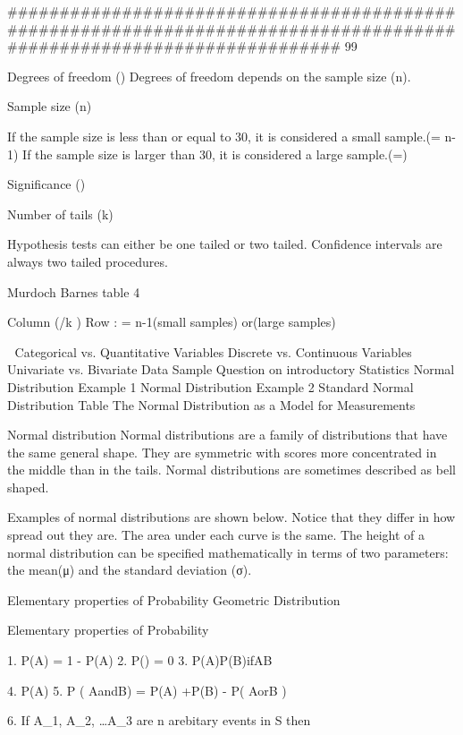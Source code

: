 

######################################################################################################################
99%


Degrees of freedom ()
Degrees of freedom depends on the sample size (n).

Sample size (n)

If the sample size is less than or equal to 30, it is considered a small sample.(= n-1)
If the sample size is larger than 30, it is considered a large sample.(=)

Significance ()

Number of tails (k)

Hypothesis tests can either be one tailed or two tailed.
Confidence intervals are always two tailed procedures.


Murdoch Barnes table 4

Column (/k )
Row : = n-1(small samples) or(large samples)



Categorical vs. Quantitative Variables
Discrete vs. Continuous Variables
Univariate vs. Bivariate Data
Sample Question on introductory Statistics
Normal Distribution Example 1
Normal Distribution Example 2
Standard Normal Distribution Table
The Normal Distribution as a Model for Measurements

Normal distribution
Normal distributions are a family of distributions that have the same general shape. They are symmetric with scores more concentrated in the middle than in the tails. Normal distributions are sometimes described as bell shaped. 

Examples of normal distributions are shown below. Notice that they differ in how spread out they are. The area under each curve is the same. The height of a normal distribution can be specified mathematically in terms of two parameters: the mean(μ) and the standard deviation (σ). 

 

Elementary properties of Probability
Geometric Distribution
 
Elementary properties of Probability
 
  1. P(A) = 1 - P(A)
2. P() = 0
3. P(A)P(B)ifAB
 
4. P(A) 
5.
P ( AandB) = P(A) +P(B) - P( AorB )
 
6. If A_1, A_2, \ldots A_3  are n arebitary events in S then
 
